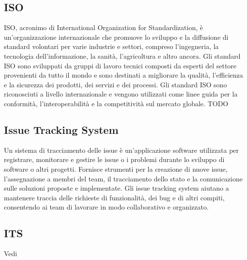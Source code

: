 \subsection*{ISO}
ISO, acronimo di International Organization for Standardization, è un'organizzazione internazionale che promuove lo sviluppo e la diffusione di standard volontari per varie industrie e settori, compreso l'ingegneria, la tecnologia dell'informazione, la sanità, l'agricoltura e altro ancora. Gli standard ISO sono sviluppati da gruppi di lavoro tecnici composti da esperti del settore provenienti da tutto il mondo e sono destinati a migliorare la qualità, l'efficienza e la sicurezza dei prodotti, dei servizi e dei processi. Gli standard ISO sono riconosciuti a livello internazionale e vengono utilizzati come linee guida per la conformità, l'interoperabilità e la competitività sul mercato globale.
TODO

\vspace{2em}
\subsection*{Issue Tracking System}
Un sistema di tracciamento delle issue è un'applicazione software utilizzata per registrare, monitorare e gestire le issue o i problemi durante lo sviluppo di software o altri progetti. Fornisce strumenti per la creazione di nuove issue, l'assegnazione a membri del team, il tracciamento dello stato e la comunicazione sulle soluzioni proposte e implementate. Gli issue tracking system aiutano a mantenere traccia delle richieste di funzionalità, dei bug e di altri compiti, consentendo ai team di lavorare in modo collaborativo e organizzato.

\vspace{2em}
\subsection*{ITS}
\par Vedi 
